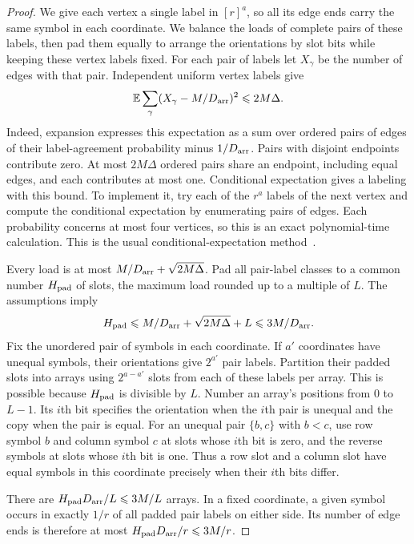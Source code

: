 \begin{proof}
We give each vertex a single label in $[r]^a$, so all its edge ends
carry the same symbol in each coordinate. We balance the loads of
complete pairs of these labels, then pad them equally to arrange
the orientations by slot bits while keeping these vertex labels fixed.
For each pair of labels let $X_\gamma$ be the number of edges with
that pair.  Independent uniform vertex labels give
\[
 \mathbb E\sum_\gamma (X_\gamma-M/D_{\rm arr})^2\le2M\Delta.
\]
Indeed, expansion expresses this expectation as a sum over ordered
pairs of edges of their label-agreement probability minus
$1/D_{\rm arr}$.  Pairs with disjoint endpoints contribute zero.
At most $2M\Delta$ ordered pairs share an endpoint, including equal
edges, and each contributes at most one.
Conditional expectation gives a labeling with this bound.  To
implement it, try each of the $r^a$ labels of the next vertex and
compute the conditional expectation by enumerating pairs of edges.
Each probability concerns at most four vertices, so this is an
exact polynomial-time calculation.  This is the usual
conditional-expectation method~\cite{Raghavan88}.

Every load is at most $M/D_{\rm arr}+\sqrt{2M\Delta}$.
Pad all pair-label classes to a common number $H_{\rm pad}$ of
slots, the maximum load rounded up to a multiple of $L$.
The assumptions imply
\[
 H_{\rm pad}\le M/D_{\rm arr}+\sqrt{2M\Delta}+L
              \le3M/D_{\rm arr}.
\]
Fix the unordered pair of symbols in each coordinate.  If $a'$
coordinates have unequal symbols, their orientations give
$2^{a'}$ pair labels.  Partition their padded slots into arrays
using $2^{a-a'}$ slots from each of these labels per array.
This is possible because $H_{\rm pad}$ is divisible by $L$.
Number an array's positions from $0$ to $L-1$.  Its $i$th bit
specifies the orientation when the $i$th pair is unequal and the copy
when the pair is equal. For an unequal pair $\{b,c\}$ with $b<c$,
use row symbol $b$ and column symbol $c$ at slots whose $i$th bit
is zero, and the reverse symbols at slots whose $i$th bit is one.
Thus a row slot and a column slot have equal symbols in this
coordinate precisely when their $i$th bits differ.

There are $H_{\rm pad}D_{\rm arr}/L\le3M/L$ arrays.  In a fixed
coordinate, a given symbol occurs in exactly $1/r$ of all padded
pair labels on either side.  Its number of edge ends is therefore
at most $H_{\rm pad}D_{\rm arr}/r\le3M/r$.
\end{proof}


